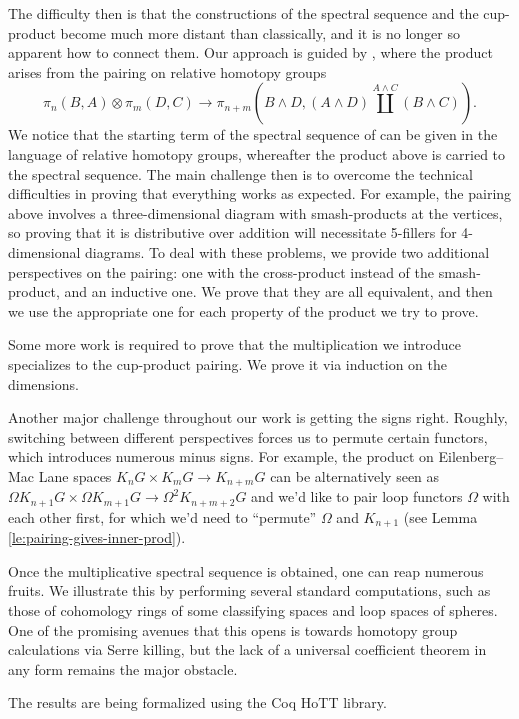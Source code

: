 \documentclass{amsart}
\theoremstyle{definition}
\begin{document}
The difficulty then is that the constructions of the spectral sequence and the cup-product become much more distant than classically, and it is no longer so apparent how to connect them. Our approach is guided by \cite{Dug1}, where the product arises from the pairing on relative homotopy groups
$$\pi_n(B,A) \otimes \pi_m(D,C) \to \pi_{n+m}(B \wedge D, (A \wedge D) \coprod^{A \wedge C}(B \wedge C) ).$$
We notice that the starting term of the spectral sequence of \cite{Flo} can be given in the language of relative homotopy groups, whereafter the product above is carried to the spectral sequence. The main challenge then is to overcome the technical difficulties in proving that everything works as expected. For example, the pairing above involves a three-dimensional diagram with smash-products at the vertices, so proving that it is distributive over addition will necessitate 5-fillers for 4-dimensional diagrams. To deal with these problems, we provide two additional perspectives on the pairing: one with the cross-product instead of the smash-product, and an inductive one. We prove that they are all equivalent, and then we use the appropriate one for each property of the product we try to prove.

Some more work is required to prove that the multiplication we introduce specializes to the cup-product pairing. We prove it via induction on the dimensions.

Another major challenge throughout our work is getting the signs right. Roughly, switching between different perspectives forces us to permute certain functors, which introduces numerous minus signs. For example, the product on Eilenberg--Mac Lane spaces $K_n G \times K_m G \to K_{n+m}G$ can be alternatively seen as $\Omega K_{n+1} G \times \Omega K_{m+1} G \to \Omega^2 K_{n+m+2}G$ and we'd like to pair loop functors $\Omega$ with each other first, for which we'd need to ``permute'' $\Omega$ and $K_{n+1}$ (see Lemma \ref{le:pairing-gives-inner-prod}).

Once the multiplicative spectral sequence is obtained, one can reap numerous fruits. We illustrate this by performing several standard computations, such as those of cohomology rings of some classifying spaces and loop spaces of spheres. One of the promising avenues that this opens is towards homotopy group calculations via Serre killing, but the lack of a universal coefficient theorem in any form remains the major obstacle.

The results are being formalized using the Coq HoTT library.
\end{document}
